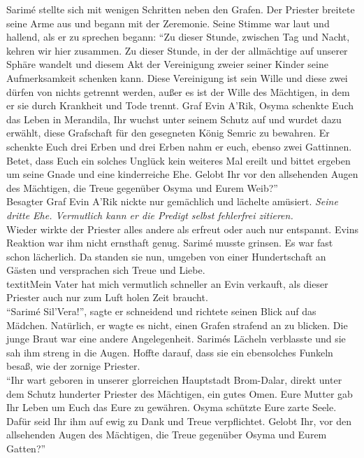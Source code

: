 Sarimé stellte sich mit wenigen Schritten neben den Grafen. Der Priester breitete seine Arme aus und 
begann mit der Zeremonie. Seine Stimme war laut und hallend, als er zu sprechen begann: ``Zu dieser 
Stunde, zwischen Tag und Nacht, kehren wir hier zusammen. Zu dieser Stunde, in der der allmächtige 
auf unserer Sphäre wandelt und diesem Akt der Vereinigung zweier seiner Kinder seine Aufmerksamkeit 
schenken kann. Diese Vereinigung ist sein Wille und diese zwei dürfen von nichts getrennt werden, 
außer es ist der Wille des Mächtigen, in dem er sie durch Krankheit und Tode trennt. Graf Evin 
A’Rik, Osyma schenkte Euch das Leben in Merandila, Ihr wuchst unter seinem Schutz auf und wurdet 
dazu erwählt, diese Grafschaft für den gesegneten König Semric zu bewahren. Er schenkte Euch drei 
Erben und drei Erben nahm er euch, ebenso zwei Gattinnen. Betet, dass Euch ein solches Unglück kein 
weiteres Mal ereilt und bittet ergeben um seine Gnade und eine kinderreiche Ehe. Gelobt Ihr vor den 
allsehenden Augen des Mächtigen, die Treue gegenüber Osyma und Eurem Weib?''\\
Besagter Graf Evin A'Rik nickte nur gemächlich und lächelte amüsiert. \textit{Seine dritte Ehe. 
Vermutlich kann er die Predigt selbst fehlerfrei zitieren.}\\
Wieder wirkte der Priester alles andere als erfreut oder auch nur entspannt. Evins Reaktion war ihm 
nicht ernsthaft genug. Sarimé musste grinsen. Es war fast schon lächerlich. Da standen sie nun, 
umgeben von einer Hundertschaft an Gästen und versprachen sich Treue und Liebe.
\\textit{Mein Vater hat mich vermutlich schneller an Evin verkauft, als dieser Priester auch nur 
zum Luft holen Zeit braucht.}\\
``Sarimé Sil'Vera!'', sagte er schneidend und richtete seinen Blick auf das Mädchen.
Natürlich, er wagte es nicht, einen Grafen strafend an zu blicken. Die junge Braut war eine andere 
Angelegenheit. Sarimés Lächeln verblasste und sie sah ihm streng in die Augen. Hoffte darauf, dass 
sie ein ebensolches Funkeln besaß, wie der zornige Priester.\\
``Ihr wart geboren in unserer glorreichen Hauptstadt Brom-Dalar, direkt unter dem Schutz hunderter 
Priester des Mächtigen, ein gutes Omen. Eure Mutter gab Ihr Leben um Euch das Eure zu gewähren. 
Osyma schützte Eure zarte Seele. Dafür seid Ihr ihm auf ewig zu Dank und Treue verpflichtet. Gelobt 
Ihr, vor den allsehenden Augen des Mächtigen, die Treue gegenüber Osyma und Eurem Gatten?''\\
